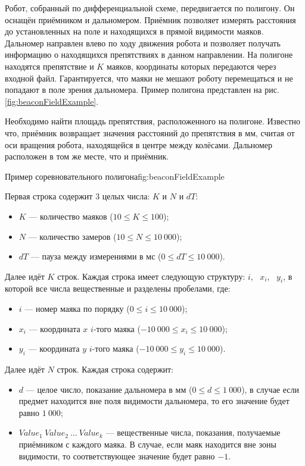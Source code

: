 
Робот, собранный по дифференциальной схеме, передвигается по полигону.
Он оснащён приёмником и дальномером.
Приёмник позволяет измерять расстояния до установленных на поле и находящихся в прямой видимости маяков.
Дальномер направлен влево по ходу движения робота и позволяет получать информацию
о находящихся препятствиях в данном направлении.
На полигоне находятся препятствие и $K$ маяков, координаты которых передаются через входной файл.
Гарантируется, что маяки не мешают роботу перемещаться и не попадают в поле зрения дальномера.
Пример полигона представлен на рис. \ref{fig:beaconFieldExample}.

Необходимо найти площадь препятствия, расположенного на полигоне.
Известно что, приёмник возвращает значения расстояний до препятствия в мм, считая от оси вращения робота,
находящейся в центре между колёсами. Дальномер расположен в том же месте, что и приёмник.

{Пример соревновательного полигона}{fig:beaconFieldExample}


Первая строка содержит 3 целых числа: $K$ и $N$ и $dT$:
\begin{itemize}
    \item $K$ --- количество маяков ($10 \leq K \leq 100$);
    \item $N$ --- количество замеров ($10 \leq N \leq 10~000$);
    \item $dT$ --- пауза между измерениями в мс ($0 \leq dT \leq 10~000$).
\end{itemize}

Далее идёт $K$ строк. Каждая строка имеет следующую структуру:
$i$,~ $x_i$,~ $y_i$, в которой все числа вещественные и разделены пробелами, где:
\begin{itemize}
    \item $i$ --- номер маяка по порядку ($0 \leq i \leq 10~000$);
    \item $x_i$ --- координата $x$ $i$-того маяка ($-10~000 \leq x_i \leq 10~000$);
    \item $y_i$ --- координата $y$ $i$-того маяка ($-10~000 \leq y_i \leq 10~000$).
\end{itemize}

Далее идёт $N$ строк. Каждая строка содержит:
\begin{itemize}
    \item $d$ --- целое число, показание дальномера в мм ($0 \leq d \leq 1~000$), в случае если предмет
    находится вне поля видимости дальномера, то его значение будет равно $1~000$;
    \item $Value_{1} ~Value_2 ~\dots ~Value_k$ --- вещественные числа, показания, получаемые приёмником с каждого маяка.
    В случае, если маяк находится вне зоны видимости, то соответствующее значение будет равно $-1$.
\end{itemize}


